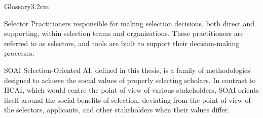\begin{mclistof}{Glossary}{3.2cm}
    \item[Selector] Practitioners responsible for making selection decisions, both direct and supporting, within selection teams and organisations. These practitioners are referred to as selectors, and tools are built to support their decision-making processes.

    \item[SOAI] Selection-Oriented AI, defined in this thesis, is a family of methodologies designed to achieve the social values of properly selecting scholars. In contrast to HCAI, which would centre the point of view of various stakeholders, SOAI orients itself around the social benefits of selection, deviating from the point of view of the selectors, applicants, and other stakeholders when their values differ.
\end{mclistof}